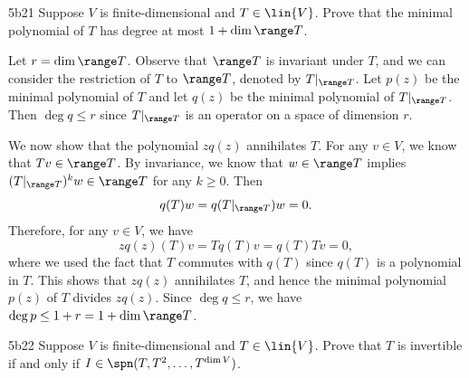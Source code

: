 \begin{exercise}{5b21}
    Suppose $V$ is finite-dimensional and $T \in \lin{V}$.
	Prove that the minimal polynomial of $T$ has degree at most $1 + \dim \range T$.

\end{exercise}

\begin{sol}
    Let $r = \dim \range T$.
    Observe that $\range T$ is invariant under $T$, and we can consider the restriction of $T$ to $\range T$, denoted by $T|_{\range T}$.
    Let $p(z)$ be the minimal polynomial of $T$ and let $q(z)$ be the minimal polynomial of $T|_{\range T}$.
    Then $\deg q \leq r$ since $T|_{\range T}$ is an operator on a space of dimension $r$.

    We now show that the polynomial $zq(z)$ annihilates $T$.
    For any $v \in V$, we know that $Tv \in \range T$.
    By invariance, we know that $w \in \range T$ implies $(T|_{\range T})^k w \in \range T$ for any $k \geq 0$.
    Then
    \[
    	q(T)w = q(T|_{\range T})w = 0.
    \]
    Therefore, for any $v \in V$, we have
    \[
    	zq(z)(T)v = T q(T)v = q(T) Tv = 0,
    \]
    where we used the fact that $T$ commutes with $q(T)$ since $q(T)$ is a polynomial in $T$.
    This shows that $zq(z)$ annihilates $T$, and hence the minimal polynomial $p(z)$ of $T$ divides $zq(z)$.
    Since $\deg q \leq r$, we have $\deg p \leq 1 + r = 1 + \dim \range T$.
\end{sol}

\begin{exercise}{5b22}
    Suppose $V$ is finite-dimensional and $T \in \lin{V}$.
	Prove that $T$ is invertible if and only if $I \in \spn(T, T^2, \ldots, T^{\dim V})$.
\end{exercise}

